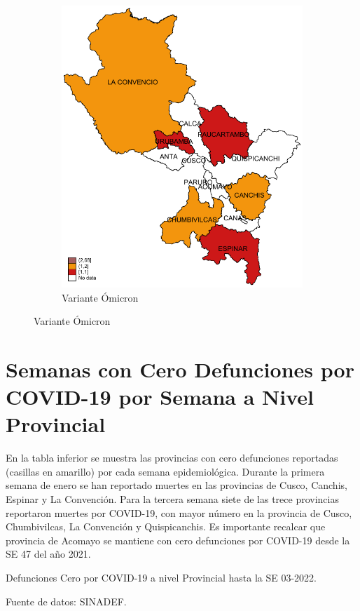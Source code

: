 \documentclass[12pt,a4paper,openany]{book}
\begin{document}
\begin{figure}[h]
\begin{subfigure}[b]{0.40\textwidth}
				\includegraphics[width=\textwidth]{../figuras/variantes_provincial_omicron.pdf}
				\caption{Variante Ómicron}
			\end{subfigure}
			\end{figure}

\clearpage


\clearpage
	\section*{Semanas con Cero Defunciones por COVID-19 por Semana a Nivel Provincial}
	
\noindent En la tabla inferior se muestra las provincias con cero defunciones reportadas (casillas en amarillo) por cada semana epidemiológica. Durante la primera semana de enero se han reportado muertes en las provincias de Cusco, Canchis, Espinar y La Convención. Para la tercera semana siete de las trece provincias reportaron muertes por COVID-19, con mayor número en la provincia de Cusco, Chumbivilcas, La Convención y Quispicanchis. Es importante recalcar que provincia de Acomayo se mantiene con cero defunciones por COVID-19 desde la SE 47 del año 2021.
	\begin{table}[h]		\caption{Defunciones Cero por COVID-19 a nivel Provincial hasta la SE 03-2022.}
		\resizebox{\textwidth}{!}{%
			
		}
		{\footnotesize {Fuente de datos: SINADEF.}}
	\end{table}
\pagebreak
\end{document}
